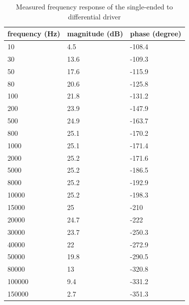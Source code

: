 \begin{table}[!ht]
    \centering
    \begin{tabular}{|l|l|l|}
    \hline
        frequency (Hz) & magnitude (dB) & phase (degree) \\ \hline \hline
        10 & 4.5 & -108.4 \\ \hline
        30 & 13.6 & -109.3 \\ \hline
        50 & 17.6 & -115.9 \\ \hline
        80 & 20.6 & -125.8 \\ \hline
        100 & 21.8 & -131.2 \\ \hline
        200 & 23.9 & -147.9 \\ \hline
        500 & 24.9 & -163.7 \\ \hline
        800 & 25.1 & -170.2 \\ \hline
        1000 & 25.1 & -171.4 \\ \hline
        2000 & 25.2 & -171.6 \\ \hline
        5000 & 25.2 & -186.5 \\ \hline
        8000 & 25.2 & -192.9 \\ \hline
        10000 & 25.2 & -198.3 \\ \hline
        15000 & 25 & -210 \\ \hline
        20000 & 24.7 & -222 \\ \hline
        30000 & 23.7 & -250.3 \\ \hline
        40000 & 22 & -272.9 \\ \hline
        50000 & 19.8 & -290.5 \\ \hline
        80000 & 13 & -320.8 \\ \hline
        100000 & 9.4 & -331.2 \\ \hline
        150000 & 2.7 & -351.3 \\ \hline
    \end{tabular}
    \captionsetup{justification=centering,singlelinecheck=true}
        \caption{Measured frequency response of the  single-ended to differential driver}
\label{tab:bode_2_3}
\end{table}